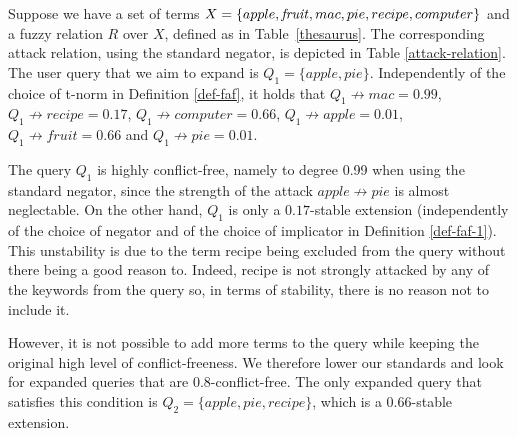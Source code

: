 \documentclass[12pt,a4paper]{article}
\newcommand{\attack}{\ensuremath{\not\rightarrow}}
\begin{document}
\begin{example}
Suppose we have a set of terms
$X = {\{ apple, \mathit{fruit}, mac, pie, recipe, computer \}}$
and a fuzzy relation $R$ over $X$, defined as in Table~\ref{thesaurus}. The corresponding attack relation, using the standard negator, is depicted in Table \ref{attack-relation}. 
The user query that we aim to expand is $Q_1=\{apple, pie\}$. Independently of the choice of t-norm in Definition \ref{def-faf}, it holds that $Q_1 \attack mac = 0.99$, $Q_1 \attack recipe = 0.17$, $Q_1 \attack computer = 0.66$, $Q_1 \attack apple = 0.01$, $Q_1 \attack fruit = 0.66$ and $Q_1 \attack pie = 0.01$. 

The query $Q_1$ is highly conflict-free, namely to degree 0.99 when using the standard negator, since the strength of the attack $apple \attack pie$ is almost neglectable. On the other hand, $Q_1$ is only a $0.17$-stable extension (independently of the choice of negator and of the choice of implicator in Definition \ref{def-faf-1}). This unstability is due to the term recipe being excluded from the query without there being a good reason to. Indeed, recipe is not strongly attacked by any of the keywords from the query so, in terms of stability, there is no reason not to include it. 
 
However, it is not possible to add more terms to the query while keeping the original high level of conflict-freeness. We therefore lower our standards and look for expanded queries that are $0.8$-conflict-free. The only expanded query that satisfies this condition is $Q_2 = \{apple, pie, recipe\}$, which is a $0.66$-stable extension.
\end{example}
\end{document}
